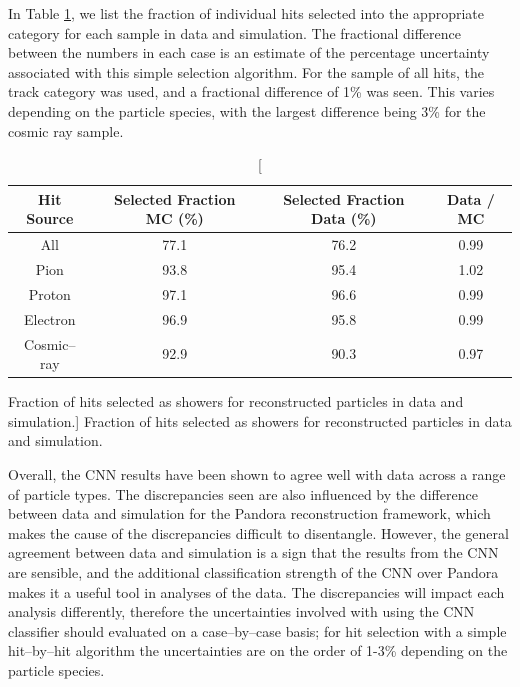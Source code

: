 In Table \ref{tab:frac_selected}, we list the fraction of individual hits 
selected into the appropriate category for each sample in data and simulation. 
The fractional difference between the numbers in each case is an estimate of 
the percentage uncertainty associated with this simple selection algorithm. 
For the sample of all hits, the track category was used, and a fractional
difference of 1\% was seen. This varies depending on the particle species, 
with the largest difference being 3\% for the cosmic ray sample. 
\begin{table}
	\centering
	\bgroup 
	\def\arraystretch{1.5}
	\begin{tabularx}{\textwidth}{@{}c|c|c|c@{}}
		Hit Source  & Selected Fraction MC (\%) & Selected Fraction Data (\%) & Data / MC\\\hline
		All         & 77.1                      & 76.2                        & 0.99     \\
		Pion        & 93.8                      & 95.4                        & 1.02     \\
		Proton      & 97.1                      & 96.6                        & 0.99     \\
		Electron    & 96.9                      & 95.8                        & 0.99     \\
		Cosmic--ray & 92.9                      & 90.3                        & 0.97
	\end{tabularx}
	\egroup
	\caption
	[Fraction of hits selected as showers for reconstructed particles in
	\protodune{} data and simulation.]
	{Fraction of hits selected as showers for reconstructed particles in
	\protodune{} data and simulation.}
	\label{tab:frac_selected}
\end{table}

Overall, the CNN results have been shown to agree well with data across a 
range of particle types. The discrepancies seen are also influenced by the 
difference between data and simulation for the Pandora reconstruction 
framework, which makes the cause of the discrepancies difficult to 
disentangle. However, the general agreement between data and simulation is a 
sign that the results from the CNN are sensible, and the additional 
classification strength of the CNN over Pandora makes it a useful tool in 
analyses of the \protodune{} data. The discrepancies will impact each analysis 
differently, therefore the uncertainties involved with using the CNN 
classifier should evaluated on a case--by--case basis; for hit selection with 
a simple hit--by--hit algorithm the uncertainties are on the order of 1-3\%
depending on the particle species.

